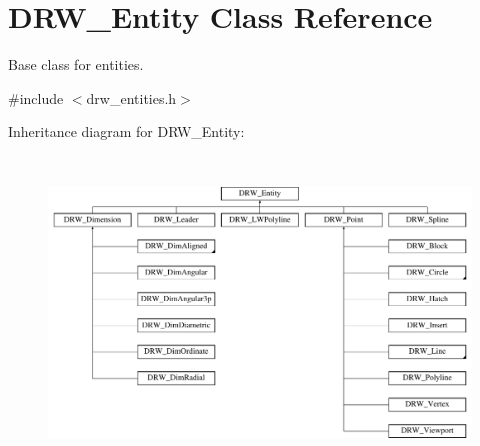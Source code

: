 \hypertarget{class_d_r_w___entity}{}\section{D\+R\+W\+\_\+\+Entity Class Reference}
\label{class_d_r_w___entity}


Base class for entities.  




{\ttfamily \#include $<$drw\+\_\+entities.\+h$>$}

Inheritance diagram for D\+R\+W\+\_\+\+Entity\+:\begin{figure}[H]
\begin{center}
\leavevmode
\includegraphics[height=8.296296cm]{d2/d59/class_d_r_w___entity}
\end{center}
\end{figure}
